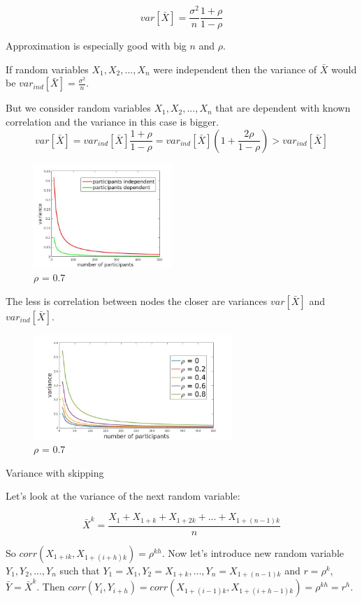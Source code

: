 \documentclass[12pt]{report}
\begin{document}
$$var\left[\bar{X} \right] = \frac{\sigma^2}{n} \frac{1+\rho}{1-\rho}$$


Approximation is especially good with big $n$ and $\rho$.

If random variables $X_1, X_2, ..., X_n$ were independent then the variance of $\bar{X}$ would be $var_{ind}[\bar{X}] = \frac{\sigma^2}{n}$.

But we consider random variables $X_1, X_2, ..., X_n$ that are dependent with known correlation and the variance in this case is bigger. 
$$ var\left[\bar{X} \right] = var_{ind}[\bar{X}]\frac{1+\rho}{1-\rho} = var_{ind}[\bar{X}]
\left(1+ \frac{2\rho}{1-\rho} \right) > var_{ind}[\bar{X}]$$


\begin{figure}[ht]
    \centering
    \includegraphics[height=150px]{varianceIndDep}
    \caption{ $\rho$ = 0.7 }
\end{figure}

The less is correlation between nodes the closer are variances $var\left[\bar{X} \right]$ and $var_{ind}[\bar{X}]$.


\begin{figure}[ht]
    \centering
    \includegraphics[height=150px]{varianceIndDep2}
    \caption{ $\rho$ = 0.7 }
\end{figure}


Variance with skipping

Let's look at the variance of the next random variable:

$$\bar{X}^k = \frac{X_1 + X_{1+k} + X_{1+2k} + ... + X_{1 + (n-1)k}}{n}$$

So $corr(X_{1 + ik}, X_{1 + (i+h)k}) = \rho^{kh}$. 
Now let's introduce new random variable $Y_1, Y_2, ..., Y_n$ such that $Y_1 = X_1, Y_2 = X_{1+k}, ..., Y_n = X_{1 + (n-1)k}$ and $r = \rho^k$, $\bar{Y}= \bar{X}^k$. Then $corr(Y_i, Y_{i+h}) = corr(X_{1 + (i-1)k}, X_{1 + (i+h-1)k}) = \rho^{kh} = r^h$.
\end{document}
